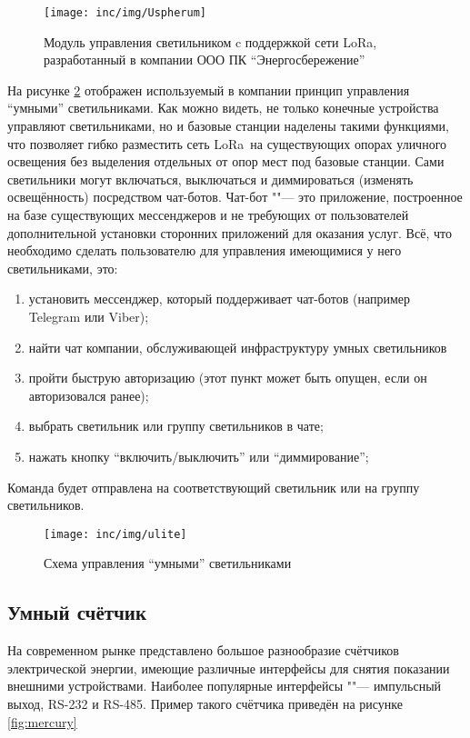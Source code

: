 \begin{figure}[!h]
  \centering
  \texttt{[image: inc/img/Uspherum]}
  \caption{Модуль управления светильником c поддержкой сети LoRa\texttrademark, 
разработанный 
в компании ООО ПК ``Энергосбережение'' \cite{isbergsite}}
  \label{fig:uspherum}
\end{figure}

На рисунке \ref{fig:ulite} отображен используемый в компании принцип управления 
``умными'' светильниками. 
Как можно видеть, не только конечные устройства управляют светильниками, но и 
базовые станции наделены такими функциями, что позволяет гибко разместить сеть 
LoRa\texttrademark~на существующих опорах уличного освещения без выделения 
отдельных от опор 
мест под базовые станции.
Сами светильники могут включаться, выключаться и диммироваться (изменять 
освещённость) посредством чат-ботов. 
Чат-бот ""--- это приложение, построенное на базе существующих мессенджеров и 
не 
требующих от пользователей дополнительной установки сторонних приложений для 
оказания услуг.
Всё, что необходимо сделать пользователю для управления имеющимися у него 
светильниками, это:
\begin{enumerate}
 \item установить мессенджер, который поддерживает чат-ботов (например Telegram 
или Viber);
 \item найти чат компании, обслуживающей инфраструктуру умных светильников
 \item пройти быструю авторизацию (этот пункт может быть опущен, если он 
авторизовался ранее);
 \item выбрать светильник или группу светильников в чате;
 \item нажать кнопку ``включить/выключить'' или ``диммирование'';
\end{enumerate}

Команда будет отправлена на соответствующий светильник или на группу 
светильников.

\begin{figure}[!h]
  \centering
  \texttt{[image: inc/img/ulite]}
  \caption{Схема управления ``умными'' светильниками \cite{isbergsite}}
  \label{fig:ulite}
\end{figure}

\subsection{Умный счётчик}

На современном рынке представлено большое разнообразие счётчиков электрической 
энергии, имеющие различные интерфейсы для снятия показании внешними 
устройствами. 
Наиболее популярные интерфейсы ""--- импульсный выход, RS-232 и RS-485.
Пример такого счётчика приведён на рисунке \ref{fig:mercury}

